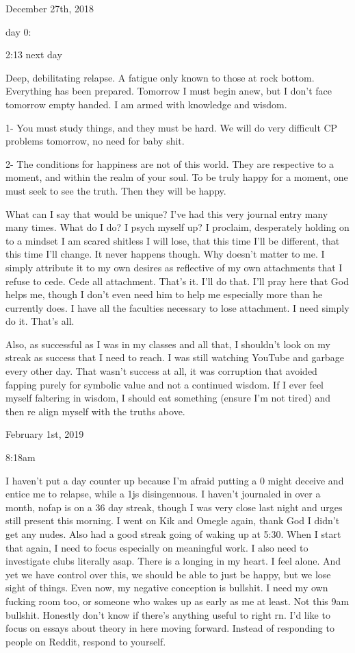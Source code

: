 \bigskip
\bigskip
December 27th, 2018

day 0:

2:13 next day

Deep, debilitating relapse. A fatigue only known to those at rock
bottom. Everything has been prepared. Tomorrow I must begin anew, but I
don't face tomorrow empty handed. I am armed with knowledge and wisdom.

1- You must study things, and they must be hard. We will do very
difficult CP problems tomorrow, no need for baby shit.

2- The conditions for happiness are not of this world. They are
respective to a moment, and within the realm of your soul. To be truly
happy for a moment, one must seek to see the truth. Then they will be
happy.

What can I say that would be unique? I've had this very journal entry
many many times. What do I do? I psych myself up? I proclaim,
desperately holding on to a mindset I am scared shitless I will lose,
that this time I'll be different, that this time I'll change. It never
happens though. Why doesn't matter to me. I simply attribute it to my
own desires as reflective of my own attachments that I refuse to cede.
Cede all attachment. That's it. I'll do that. I'll pray here that God
helps me, though I don't even need him to help me especially more than
he currently does. I have all the faculties necessary to lose
attachment. I need simply do it. That's all.

Also, as successful as I was in my classes and all that, I shouldn't
look on my streak as success that I need to reach. I was still watching
YouTube and garbage every other day. That wasn't success at all, it was
corruption that avoided fapping purely for symbolic value and not a
continued wisdom. If I ever feel myself faltering in wisdom, I should
eat something (ensure I'm not tired) and then re align myself with the
truths above.

\bigskip
\bigskip
February 1st, 2019

8:18am

I haven't put a day counter up because I'm afraid putting a 0 might
deceive and entice me to relapse, while a 1js disingenuous. I haven't
journaled in over a month, nofap is on a 36 day streak, though I was
very close last night and urges still present this morning. I went on
Kik and Omegle again, thank God I didn't get any nudes. Also had a good
streak going of waking up at 5:30. When I start that again, I need to
focus especially on meaningful work. I also need to investigate clubs
literally asap. There is a longing in my heart. I feel alone. And yet we
have control over this, we should be able to just be happy, but we lose
sight of things. Even now, my negative conception is bullshit. I need my
own fucking room too, or someone who wakes up as early as me at least.
Not this 9am bullshit. Honestly don't know if there's anything useful to
right rn. I'd like to focus on essays about theory in here moving
forward. Instead of responding to people on Reddit, respond to yourself.

